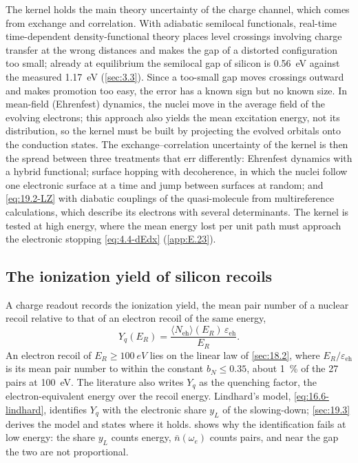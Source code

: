 The kernel holds the main theory uncertainty of the charge channel, which comes from exchange and correlation. With adiabatic semilocal functionals, real-time time-dependent density-functional theory places level crossings involving charge transfer at the wrong distances and makes the gap of a distorted configuration too small; already at equilibrium the semilocal gap of silicon is \SI{0.56}{eV} against the measured \SI{1.17}{eV} (\cref{sec:3.3}). Since a too-small gap moves crossings outward and makes promotion too easy, the error has a known sign but no known size. In mean-field (Ehrenfest) dynamics, the nuclei move in the average field of the evolving electrons; this approach also yields the mean excitation energy, not its distribution, so the kernel must be built by projecting the evolved orbitals onto the conduction states. The exchange--correlation uncertainty of the kernel is then the spread between three treatments that err differently: Ehrenfest dynamics with a hybrid functional; surface hopping with decoherence, in which the nuclei follow one electronic surface at a time and jump between surfaces at random; and \cref{eq:19.2-LZ} with diabatic couplings of the quasi-molecule from multireference calculations, which describe its electrons with several determinants. The kernel is tested at high energy, where the mean energy lost per unit path must approach the electronic stopping \cref{eq:4.4-dEdx} (\cref{app:E.23}).

\subsection{The ionization yield of silicon recoils}\label{sec:19.2-yield}

A charge readout records the ionization yield, the mean pair number of a nuclear recoil relative to that of an electron recoil of the same energy,
\begin{equation}
  Y_q(E_R) = \frac{\langle N_{\mathrm{eh}}\rangle(E_R)\,\varepsilon_{\mathrm{eh}}}{E_R} .
  \label{eq:19.2-Yq}
\end{equation}
An electron recoil of $E_R \ge \SI{100}{eV}$ lies on the linear law of \cref{sec:18.2}, where $E_R/\varepsilon_{\mathrm{eh}}$ is its mean pair number to within the constant $b_N \le 0.35$, about \SI{1}{\percent} of the 27 pairs at \SI{100}{eV}. The literature also writes $Y_q$ as the quenching factor, the electron-equivalent energy over the recoil energy. Lindhard's model, \cref{eq:16.6-lindhard}, identifies $Y_q$ with the electronic share $y_L$ of the slowing-down; \cref{sec:19.3} derives the model and states where it holds.  shows why the identification fails at low energy: the share $y_L$ counts energy, $\bar n(\omega_e)$ counts pairs, and near the gap the two are not proportional.


